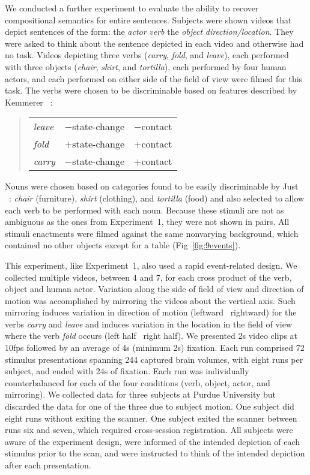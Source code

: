 We conducted a further experiment to evaluate the ability to recover
compositional semantics for entire sentences.
%
Subjects were shown videos that depict sentences of the form: the \emph{actor}
\emph{verb} the \emph{object} \emph{direction/location}.
%
They were asked to think about the sentence depicted in each video and
otherwise had no task.
%
Videos depicting three verbs (\emph{carry}, \emph{fold}, and \emph{leave}),
each performed with three objects (\emph{chair}, \emph{shirt}, and
\emph{tortilla}), each performed by four human actors, and each performed on
either side of the field of view were filmed for this task.
%
The verbs were chosen to be discriminable based on features described
by Kemmerer \etal\ \cite{kemmerer2008}:
%
\begin{quote}
  \begin{tabular}{lrr}
    \emph{leave} & $-$state-change & $-$contact\\
    \emph{fold}  & $+$state-change & $+$contact\\
    \emph{carry} & $-$state-change & $+$contact\\
  \end{tabular}
\end{quote}
%
\noindent
%
Nouns were chosen based on categories found to be easily discriminable
by Just \etal\ \cite{just2010}: \emph{chair} (furniture), \emph{shirt}
(clothing), and \emph{tortilla} (food) and also selected to allow each
verb to be performed with each noun.
%
Because these stimuli are not as ambiguous as the ones from Experiment~1,
they were not shown in pairs.
%
All stimuli enactments were filmed against the same nonvarying background,
which contained no other objects except for a table (Fig~\ref{fig:9events}).

This experiment, like Experiment~1, also used a rapid event-related
design.
%
We collected multiple videos, between 4 and 7, for each cross product of the
verb, object and human actor.
%
Variation along the side of field of view and direction of motion was
accomplished by mirroring the videos about the vertical axis.
%
Such mirroring induces variation in direction of motion (leftward
\vs\ rightward) for the verbs \emph{carry} and \emph{leave} and induces
variation in the location in the field of view where the verb \emph{fold} occurs
(left half \vs\ right half).
%
We presented 2s video clips at 10fps followed by an average of 4s (minimum 2s)
fixation.
%
Each run comprised 72 stimulus presentations spanning 244 captured brain
volumes, with eight runs per subject, and ended with 24s of fixation.
%
Each run was individually counterbalanced for each of the four conditions
(verb, object, actor, and mirroring).
%
We collected data for three subjects at Purdue University but discarded the
data for one of the three due to subject motion.
%
One subject did eight runs without exiting the scanner.
%
One subject exited the scanner between runs six and seven, which required
cross-session registration.
%
All subjects were aware of the experiment design, were informed of the intended
depiction of each stimulus prior to the scan, and were instructed to think of
the intended depiction after each presentation.

